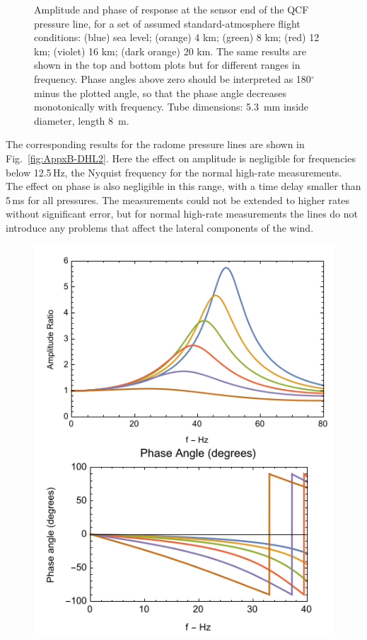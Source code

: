 \documentclass[12pt,twoside,english]{article}\usepackage[]{graphicx}\usepackage[]{color}
\begin{document}
{{\begin{appendices}
\begin{figure}
\protect\caption[Amplitude ratio and phase for transmission through the QCF pressure line.]{\label{fig:AppxB-DHL1}Amplitude and phase of response at the sensor end of the QCF pressure line, for a set of assumed standard-atmosphere flight conditions: (blue) sea level; (orange) 4 km; (green) 8 km; (red) 12 km; (violet) 16 km; (dark orange) 20 km. The same results are shown in the top and bottom plots but for different ranges in frequency. Phase angles above zero should be interpreted as 180$^{\circ}$ minus the plotted angle, so that the phase angle decreases monotonically with frequency. Tube dimensions: 5.3~mm inside diameter, length 8~m. } 
\end{figure}

The corresponding results for the radome pressure lines are shown in Fig.~\ref{fig:AppxB-DHL2}. Here the effect on amplitude is negligible for frequencies below 12.5\,Hz, the Nyquist frequency for the normal high-rate measurements. The effect on phase is also negligible in this range, with a time delay smaller than 5\,ms for all pressures. The measurements could not be extended to higher rates without significant error, but for normal high-rate measurements the lines do not introduce any problems that affect the lateral components of the wind.
\begin{figure}
\noindent \begin{centering}
\includegraphics[height=0.6\textheight]{SpecialGraphics/PressureLines2.png}  
\par\end{centering}


\end{figure}
\end{appendices}}}
\end{document}
